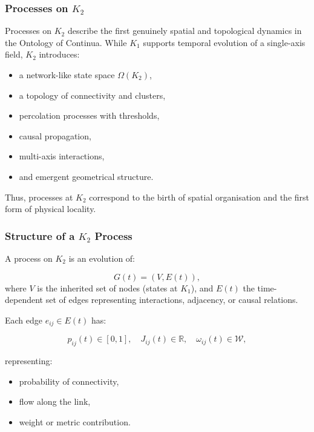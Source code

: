 

\subsubsection{Processes on \texorpdfstring{$K_2$}{K_2}}
\label{sec:processes-k2}

Processes on $K_2$ describe the first genuinely spatial and topological
dynamics in the Ontology of Continua. While $K_1$ supports temporal
evolution of a single-axis field, $K_2$ introduces:

\begin{itemize}
    \item a network-like state space $\Omega(K_2)$,
    \item a topology of connectivity and clusters,
    \item percolation processes with thresholds,
    \item causal propagation,
    \item multi-axis interactions,
    \item and emergent geometrical structure.
\end{itemize}

Thus, processes at $K_2$ correspond to the birth of spatial organisation
and the first form of physical locality.

\subsubsection{Structure of a \texorpdfstring{$K_2$}{K_2} Process}

A process on $K_2$ is an evolution of:

\[
G(t) = (V, E(t)),
\]
where $V$ is the inherited set of nodes (states at $K_1$), and $E(t)$
the time-dependent set of edges representing interactions, adjacency,
or causal relations.

Each edge $e_{ij} \in E(t)$ has:

\[
p_{ij}(t) \in [0,1], \quad
J_{ij}(t) \in \mathbb{R}, \quad
\omega_{ij}(t) \in \mathcal{W},
\]

representing:
\begin{itemize}
    \item probability of connectivity,
    \item flow along the link,
    \item weight or metric contribution.
\end{itemize}

